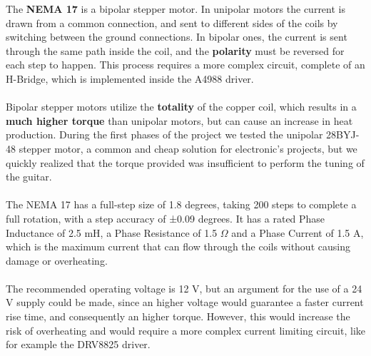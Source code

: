 The \textbf{NEMA 17} is a bipolar stepper motor. In unipolar motors the current is drawn from
a common connection, and sent to different sides of the coils by switching between the ground connections.
In bipolar ones, the current is sent through the same path inside the coil, and the
\textbf{polarity} must be reversed for each step to happen.
This process requires a more complex circuit, complete of an H-Bridge, which is
implemented inside the A4988 driver.
\paragraph{}

Bipolar stepper motors utilize the \textbf{totality} of the copper coil, which results in a \textbf{much higher
torque} than unipolar motors, but can cause an increase in heat production.
During the first phases of the project we tested the unipolar 28BYJ-48 stepper motor,
a common and cheap solution for electronic's projects, but we quickly realized that
the torque provided was insufficient to perform the tuning of the guitar.
\paragraph{}

The NEMA 17 has a full-step size of 1.8 degrees, taking 200 steps to complete a full rotation,
with a step accuracy of ±0.09 degrees.
It has a rated Phase Inductance of 2.5 mH, a Phase Resistance of 1.5 $\Omega$ and a
Phase Current of 1.5 A, which is the maximum current that can flow through
the coils without causing damage or overheating.
\paragraph{}

The recommended operating voltage is 12 V, but an argument for the use of a 24 V supply
could be made, since an higher voltage would guarantee a faster current rise time,
and consequently an higher torque.
However, this would increase the risk of overheating and would require a more
complex current limiting circuit, like for example the DRV8825 driver.
